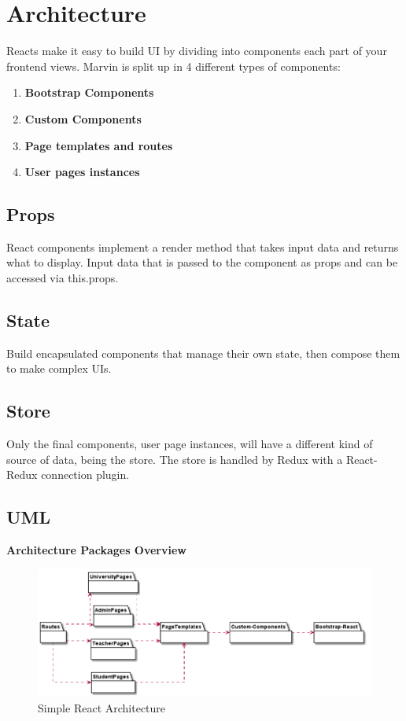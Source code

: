 \documentclass[../react.tex]{subfiles}
\begin{document}
	
	\section{Architecture}

	Reacts make it easy to build UI by dividing into components each part of your frontend views.
	Marvin is split up in 4 different types of components:
	\begin{enumerate} 
		\item \textbf{Bootstrap Components}
		\item \textbf{Custom Components}
		\item \textbf{Page templates and routes}
		\item \textbf{User pages instances}
	\end{enumerate} 

	\subsection{Props}
	React components implement a render method that takes input data and returns what to display.
	Input data that is passed to the component as props and can be accessed via this.props.

	\subsection{State}
	Build encapsulated components that manage their own state, then compose them to make complex UIs.

	\subsection{Store}
	Only the final components, user page instances, will have a different kind of source of data, being the store.
	The store is handled by Redux with a React-Redux connection plugin.
	
	\subsection{UML} %
	
	\textbf{Architecture Packages Overview}
	\begin{figure}[H]
		\centering
		\includegraphics[width=1\linewidth]{"diagrammi/react/simplearch"}
		\caption{Simple React Architecture}
		\label{fig:Simple React Architecture}
	\end{figure}
	
\end{document}
